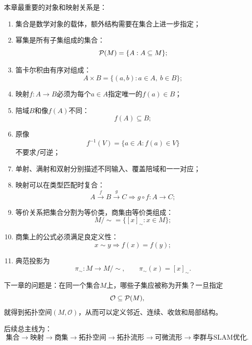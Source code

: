 本章最重要的对象和映射关系是：

\begin{enumerate}
    \item 集合是数学对象的载体，额外结构需要在集合上进一步指定；
    \item 幂集是所有子集组成的集合：
    \[
        \P(M)=\{A:A\subseteq M\};
    \]
    \item 笛卡尔积由有序对组成：
    \[
        A\times B=\{(a,b):a\in A,\ b\in B\};
    \]
    \item 映射$f:A\to B$必须为每个$a\in A$指定唯一的$f(a)\in B$；
    \item 陪域$B$和像$f(A)$不同：
    \[
        f(A)\subseteq B;
    \]
    \item 原像
    \[
        f^{-1}(V)=\{a\in A:f(a)\in V\}
    \]
    不要求$f$可逆；
    \item 单射、满射和双射分别描述不同输入、覆盖陪域和一一对应；
    \item 映射可以在类型匹配时复合：
    \[
        A\xrightarrow{f}B\xrightarrow{g}C
        \Longrightarrow
        g\circ f:A\to C;
    \]
    \item 等价关系把集合分割为等价类，商集由等价类组成：
    \[
        M/{\sim}=\{[x]_{\sim}:x\in M\};
    \]
    \item 商集上的公式必须满足良定义性：
    \[
        x\sim y\Longrightarrow f(x)=f(y);
    \]
    \item 典范投影为
    \[
        \pi_{\sim}:M\to M/{\sim},
        \qquad
        \pi_{\sim}(x)=[x]_{\sim}.
    \]
\end{enumerate}

下一章的问题是：在同一个集合$M$上，哪些子集应被称为开集？一旦指定
\[
    \mathcal O\subseteq\P(M),
\]
就得到拓扑空间$(M,\mathcal O)$，从而可以定义邻近、连续、收敛和局部结构。

后续总主线为：
\[
    \text{集合}
    \to
    \text{映射}
    \to
    \text{商集}
    \to
    \text{拓扑空间}
    \to
    \text{拓扑流形}
    \to
    \text{可微流形}
    \to
    \text{李群与SLAM优化}.
\]